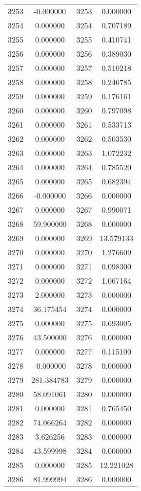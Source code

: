 \documentclass[12pt]{article}
\begin{document}
\begin{longtable}{@{}cccc@{}}
3253 & -0.000000 & 3253 & 0.000000 \\
3254 & 0.000000 & 3254 & 0.707189 \\
3255 & 0.000000 & 3255 & 0.410741 \\
3256 & 0.000000 & 3256 & 0.389030 \\
3257 & 0.000000 & 3257 & 0.510218 \\
3258 & 0.000000 & 3258 & 0.246785 \\
3259 & 0.000000 & 3259 & 0.176161 \\
3260 & 0.000000 & 3260 & 0.797098 \\
3261 & 0.000000 & 3261 & 0.533713 \\
3262 & 0.000000 & 3262 & 0.503530 \\
3263 & 0.000000 & 3263 & 1.072232 \\
3264 & 0.000000 & 3264 & 0.785520 \\
3265 & 0.000000 & 3265 & 0.682394 \\
3266 & -0.000000 & 3266 & 0.000000 \\
3267 & 0.000000 & 3267 & 0.990071 \\
3268 & 59.900000 & 3268 & 0.000000 \\
3269 & 0.000000 & 3269 & 13.579133 \\
3270 & 0.000000 & 3270 & 1.276609 \\
3271 & 0.000000 & 3271 & 0.098300 \\
3272 & 0.000000 & 3272 & 1.067164 \\
3273 & 2.000000 & 3273 & 0.000000 \\
3274 & 36.175454 & 3274 & 0.000000 \\
3275 & 0.000000 & 3275 & 0.693005 \\
3276 & 43.500000 & 3276 & 0.000000 \\
3277 & 0.000000 & 3277 & 0.115100 \\
3278 & -0.000000 & 3278 & 0.000000 \\
3279 & 281.384783 & 3279 & 0.000000 \\
3280 & 58.091061 & 3280 & 0.000000 \\
3281 & 0.000000 & 3281 & 0.765450 \\
3282 & 74.066264 & 3282 & 0.000000 \\
3283 & 3.626256 & 3283 & 0.000000 \\
3284 & 43.599998 & 3284 & 0.000000 \\
3285 & 0.000000 & 3285 & 12.221028 \\
3286 & 81.999994 & 3286 & 0.000000 \\

\end{longtable}
\end{document}
